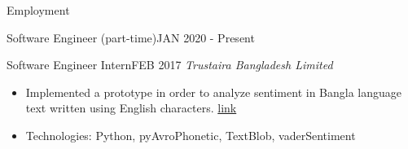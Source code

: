 \documentclass[]{mcdowellcv}
\begin{document}
\begin{cvsection}{Employment}
\begin{cvsubsection}{Software Engineer (part-time)}{}{JAN 2020 - Present}
\begin{itemize}
    	        
    	    \end{itemize}
    	
    	\end{cvsubsection}
	
    	\begin{cvsubsection}{Software Engineer Intern}{}{FEB 2017}
    	\emph{Trustaira Bangladesh Limited}
    	    \begin{itemize}
    	        \item Implemented a prototype in order to analyze sentiment in Bangla language text written using English characters. \href{https://techfoxweb.wordpress.com/2017/07/24/banglish-sentiment-analysis/}{link}
    	        \item Technologies: Python, pyAvroPhonetic, TextBlob, vaderSentiment 
    	        
    	    \end{itemize}
    	
    	\end{cvsubsection}
    	
    
        
    	        
    	
	
	
	
	\end{cvsection}
	
\end{document}
